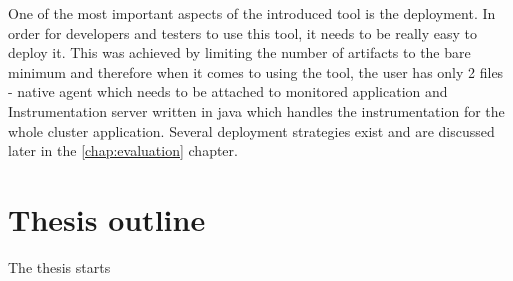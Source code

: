 One of the most important aspects of the introduced tool is the deployment. In order for developers and testers to use this tool, it needs to be really easy to deploy it. This was achieved by limiting the number of artifacts to the bare minimum and therefore when it comes to using the tool, the user has only 2 files - native agent which needs to be attached to monitored application and Instrumentation server written in java which handles the instrumentation for the whole cluster application. Several deployment strategies exist and are discussed later in the \ref{chap:evaluation} chapter.

\section{Thesis outline}
The thesis starts 

